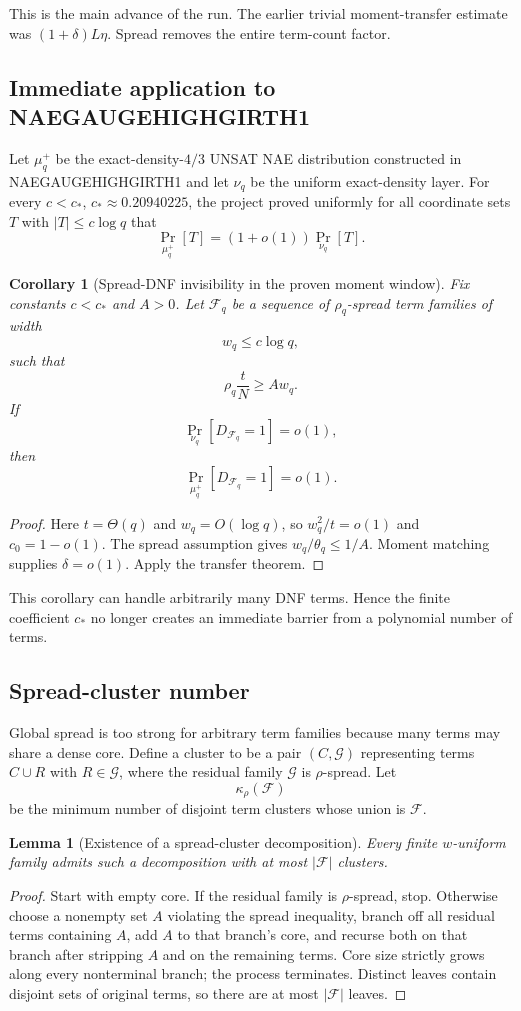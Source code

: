 \documentclass[11pt]{article}
\newtheorem{lemma}[theorem]{Lemma}
\newtheorem{corollary}[theorem]{Corollary}
\begin{document}
This is the main advance of the run. The earlier trivial moment-transfer estimate was $(1+\delta)L\eta$. Spread removes the entire term-count factor.

\subsection{Immediate application to NAEGAUGEHIGHGIRTH1}
Let $\mu_q^+$ be the exact-density-$4/3$ UNSAT NAE distribution constructed in NAEGAUGEHIGHGIRTH1 and let $\nu_q$ be the uniform exact-density layer. For every $c<c_*$, $c_*\approx0.20940225$, the project proved uniformly for all coordinate sets $T$ with $|T|\le c\log q$ that
\[\Pr_{\mu_q^+}[T]=(1+o(1))\Pr_{\nu_q}[T].\]

\begin{corollary}[Spread-DNF invisibility in the proven moment window]
Fix constants $c<c_*$ and $A>0$. Let $\mathcal F_q$ be a sequence of $\rho_q$-spread term families of width
\[w_q\le c\log q,\]
such that
\[\rho_q\frac{t}{N}\ge A w_q.\]
If
\[\Pr_{\nu_q}[D_{\mathcal F_q}=1]=o(1),\]
then
\[\boxed{\Pr_{\mu_q^+}[D_{\mathcal F_q}=1]=o(1).}\]
\end{corollary}
\begin{proof}
Here $t=\Theta(q)$ and $w_q=O(\log q)$, so $w_q^2/t=o(1)$ and $c_0=1-o(1)$. The spread assumption gives $w_q/\theta_q\le1/A$. Moment matching supplies $\delta=o(1)$. Apply the transfer theorem.
\end{proof}

This corollary can handle arbitrarily many DNF terms. Hence the finite coefficient $c_*$ no longer creates an immediate barrier from a polynomial number of terms.

\subsection{Spread-cluster number}
Global spread is too strong for arbitrary term families because many terms may share a dense core. Define a cluster to be a pair $(C,\mathcal G)$ representing terms $C\cup R$ with $R\in\mathcal G$, where the residual family $\mathcal G$ is $\rho$-spread. Let
\[\kappa_\rho(\mathcal F)\]
be the minimum number of disjoint term clusters whose union is $\mathcal F$.

\begin{lemma}[Existence of a spread-cluster decomposition]
Every finite $w$-uniform family admits such a decomposition with at most $|\mathcal F|$ clusters.
\end{lemma}
\begin{proof}
Start with empty core. If the residual family is $\rho$-spread, stop. Otherwise choose a nonempty set $A$ violating the spread inequality, branch off all residual terms containing $A$, add $A$ to that branch's core, and recurse both on that branch after stripping $A$ and on the remaining terms. Core size strictly grows along every nonterminal branch; the process terminates. Distinct leaves contain disjoint sets of original terms, so there are at most $|\mathcal F|$ leaves.
\end{proof}
\end{document}
